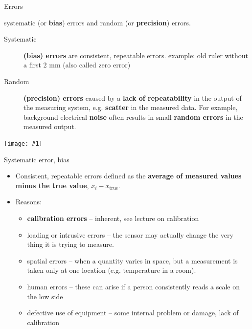 \documentclass[12pt]{beamer}
\newcommand{\fig}[1]{\centering\texttt{[image: \#1]}}
\begin{document}
\begin{frame}[plain]{Errors}

\alert{systematic} (or \textbf{bias}) errors and \alert{random} (or \textbf{precision})
errors. 


\begin{description}
\item [{Systematic}] \textbf{(bias) errors} are consistent, repeatable
errors. example: old ruler without a first 2 mm (also called zero
error)
\item [{Random}] \textbf{(precision) errors} caused by a \textbf{lack of
repeatability} in the output of the measuring system, e.g. \textbf{scatter}
in the measured data. For example, background electrical \textbf{noise}
often results in small \textbf{random errors} in the measured output. 
\end{description}
\end{frame}

\begin{frame}
	\fig{random_systematic_error}
\end{frame}

\begin{frame}{Systematic error, bias}

\begin{itemize}
\item Consistent, repeatable errors defined as the
\textbf{average of measured values minus the true value}, $\overline{x_{i}-x_{\mathrm{true}}}$. 
\item Reasons: 
\begin{itemize}
\item {\bf calibration errors } -- inherent, see lecture on calibration 
\item loading or intrusive errors -- the sensor may actually change the very
thing it is trying to measure. 
\item spatial errors -- when a quantity varies in space, but a measurement
is taken only at one location (e.g. temperature in a room). 
\item human errors -- these can arise if a person consistently reads a scale
on the low side
\item defective use of equipment --  some internal problem or damage, lack of calibration 
\end{itemize}
\end{itemize}
\end{frame}
\end{document}
